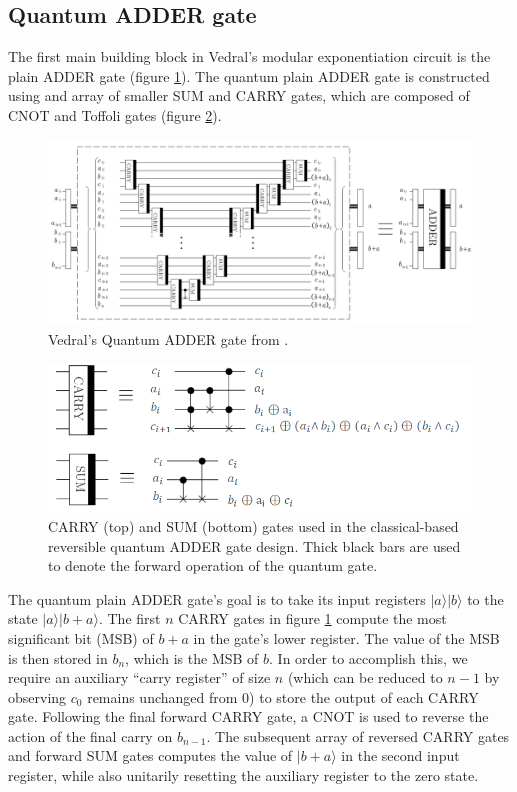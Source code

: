 \documentclass{article}
\begin{document}
\subsection{Quantum ADDER gate}
\label{sec:vedralADDER}
The first main building block in Vedral's modular exponentiation circuit is the plain ADDER gate (figure \ref{fig:vedralADDER}). The quantum plain ADDER gate is constructed using and array of smaller SUM and CARRY gates, which are composed of CNOT and Toffoli gates (figure \ref{fig:carrysumgates}).
\begin{figure}[!htbp]
\centering
\includegraphics[width=1\textwidth]
{vedraladder.png}
\captionsetup{format = hang}
\caption{Vedral's Quantum ADDER gate from \cite{VBE95}.}
\label{fig:vedralADDER}
\end{figure}

\begin{figure}[!htbp]
\centering
\includegraphics[width=.8\textwidth]
{carrysumgates.png}
\captionsetup{format = hang}
\caption{CARRY (top) and SUM (bottom) gates used in the classical-based reversible quantum ADDER gate design. Thick black bars are used to denote the forward operation of the quantum gate.}
\label{fig:carrysumgates}
\end{figure}

The quantum plain ADDER gate's goal is to take its input registers $|a\rangle |b\rangle$ to the state $|a\rangle |b+a\rangle$. The first $n$ CARRY gates in figure \ref{fig:vedralADDER} compute the most significant bit (MSB) of $b+a$ in the gate's lower register. The value of the MSB is then stored in $b_n$, which is the MSB of $b$. In order to accomplish this, we require an auxiliary ``carry register'' of size $n$ (which can be reduced to $n-1$ by observing $c_0$ remains unchanged from 0) to store the output of each CARRY gate. Following the final forward CARRY gate, a CNOT is used to reverse the action of the final carry on $b_{n-1}$. The subsequent array of reversed CARRY gates and forward SUM gates computes the value of $|b+a\rangle$ in the second input register, while also unitarily resetting the auxiliary register to the zero state. 
\end{document}
